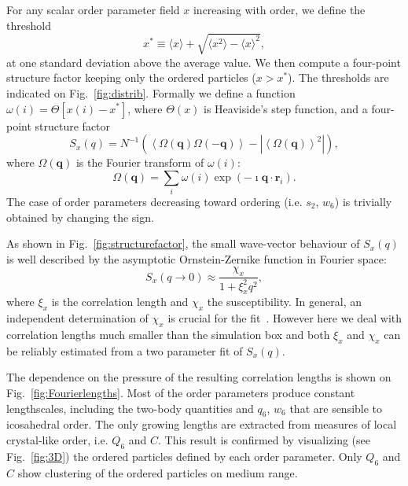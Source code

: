 \documentclass[twocolumn,superscriptaddress]{revtex4-1}
\begin{document}
For any scalar order parameter field $x$ increasing with order, we define the threshold 
\begin{equation}
x^* \equiv \langle x\rangle + \sqrt{\langle x^2\rangle - \langle x\rangle^2},
\label{eq:xstar}
\end{equation}
at one standard deviation above the average value. We then compute a four-point structure factor keeping only the ordered particles ($x>x^*$). The thresholds are indicated on Fig.~\ref{fig:distrib}. Formally we define a function $\omega(i) = \Theta [x(i) - x^*]$, where $\Theta(x)$ is Heaviside’s step function, and a four-point structure factor
\begin{equation}
	S_x(q) = N^{-1}(\left\langle \Omega(\mathbf{q}) \Omega(-\mathbf{q}) \right\rangle - | \left\langle \Omega(\mathbf{q}) \right\rangle^2 |),   
	\label{eq:StrutureFactor}
\end{equation}
where $\Omega(\mathbf{q})$ is the Fourier transform of $\omega(i)$: 
\begin{equation}
	\Omega(\mathbf{q}) = \sum_i \omega(i)\exp(-\imath \mathbf{q}\cdot\mathbf{r}_i).  
\end{equation}
The case of order parameters decreasing toward ordering (i.e. $s_2$, $w_6$) is trivially obtained by changing the sign.

As shown in Fig.~\ref{fig:structurefactor}, the small wave-vector behaviour of $S_x(q)$ is well described by the asymptotic Ornstein-Zernike function in Fourier space:
\begin{equation}
	S_x(q\rightarrow 0) \approx \frac{\chi_x}{1+\xi_x^2 q^2},
	\label{eq:OZ_Fourier}
\end{equation}
where $\xi_x$ is the correlation length and $\chi_x$ the susceptibility. In general, an independent determination of $\chi_x$ is crucial for the fit~\cite{Flenner2011}. However here we deal with correlation lengths much smaller than the simulation box and both $\xi_x$ and $\chi_x$ can be reliably estimated from a two parameter fit of $S_x(q)$.

The dependence on the pressure of the resulting correlation lengths is shown on Fig.~\ref{fig:Fourierlengths}. Most of the order parameters produce constant lengthscales, including the two-body quantities and $q_6$, $w_6$ that are sensible to icosahedral order. The only growing lengths are extracted from measures of local crystal-like order, i.e. $Q_6$ and $C$. This result is confirmed by visualizing (see Fig.~\ref{fig:3D}) the ordered particles defined by each order parameter. Only $Q_6$ and $C$ show clustering of the ordered particles on medium range.
\end{document}
